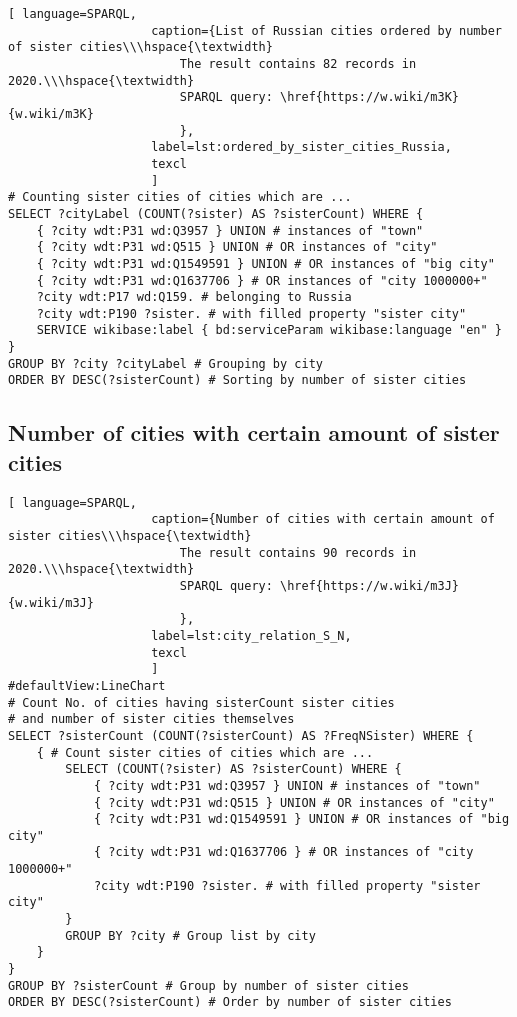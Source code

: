\begin{lstlisting}[ language=SPARQL, 
                    caption={List of Russian cities ordered by number of sister cities\\\hspace{\textwidth}
                        The result contains 82 records in 2020.\\\hspace{\textwidth}
                        SPARQL query: \href{https://w.wiki/m3K}{w.wiki/m3K}
                        },
                    label=lst:ordered_by_sister_cities_Russia,
                    texcl 
                    ]
# Counting sister cities of cities which are ...
SELECT ?cityLabel (COUNT(?sister) AS ?sisterCount) WHERE {           
	{ ?city wdt:P31 wd:Q3957 } UNION # instances of "town"
	{ ?city wdt:P31 wd:Q515 } UNION # OR instances of "city"
	{ ?city wdt:P31 wd:Q1549591 } UNION # OR instances of "big city"
	{ ?city wdt:P31 wd:Q1637706 } # OR instances of "city 1000000+"      
	?city wdt:P17 wd:Q159. # belonging to Russia
	?city wdt:P190 ?sister. # with filled property "sister city"
	SERVICE wikibase:label { bd:serviceParam wikibase:language "en" }
}
GROUP BY ?city ?cityLabel # Grouping by city
ORDER BY DESC(?sisterCount) # Sorting by number of sister cities
\end{lstlisting}%

\subsection{Number of cities with certain amount of sister cities}

\begin{lstlisting}[ language=SPARQL, 
                    caption={Number of cities with certain amount of sister cities\\\hspace{\textwidth}
                        The result contains 90 records in 2020.\\\hspace{\textwidth}
                        SPARQL query: \href{https://w.wiki/m3J}{w.wiki/m3J}
                        },
                    label=lst:city_relation_S_N,
                    texcl 
                    ]
#defaultView:LineChart
# Count No. of cities having sisterCount sister cities 
# and number of sister cities themselves
SELECT ?sisterCount (COUNT(?sisterCount) AS ?FreqNSister) WHERE {                                                                         
	{ # Count sister cities of cities which are ...
		SELECT (COUNT(?sister) AS ?sisterCount) WHERE {        
			{ ?city wdt:P31 wd:Q3957 } UNION # instances of "town"
			{ ?city wdt:P31 wd:Q515 } UNION # OR instances of "city"
			{ ?city wdt:P31 wd:Q1549591 } UNION # OR instances of "big city"
			{ ?city wdt:P31 wd:Q1637706 } # OR instances of "city 1000000+"
			?city wdt:P190 ?sister. # with filled property "sister city"
		}
		GROUP BY ?city # Group list by city
	}
}
GROUP BY ?sisterCount # Group by number of sister cities                                     
ORDER BY DESC(?sisterCount) # Order by number of sister cities 
\end{lstlisting}%


